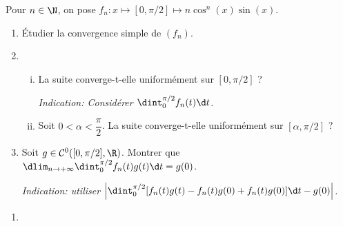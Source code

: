 \begin{enonce}
\begin{exercise}[ID={RMS134 E1489},subtitle={CCINP MP 2023},difficulty={},tags={analyse, ccinp, 2023}]
  Pour $n\in\N$, on pose $f_n:x\mapsto[0,\pi/2]\mapsto n\cos^n(x)\sin(x)$.
 \begin{enumerate}[\bfseries a)]
  \item Étudier la convergence simple de $(f_n)$.
  \item
    \begin{enumerate}[i)]
    \item La suite converge-t-elle uniformément sur $[0,\pi/2]$ ?
      
      {\itshape Indication: Considérer $\dint_0^{\pi/2}f_n(t)\d t$.}
    \item Soit $0<\alpha<\dfrac{\pi}2$. La suite converge-t-elle
      uniformément sur $[\alpha,\pi/2]$ ?
    \end{enumerate}
  \item Soit $g\in\mathcal{C}^0([0,\pi/2],\R)$. Montrer que
    $\dlim_{n\to +\infty}\dint_0^{\pi/2} f_n(t)g(t)\d t=g(0)$.

    {\itshape Indication: utiliser
      $\left|\dint_0^{\pi/2}[f_n(t)g(t)-f_n(t)g(0)+f_n(t)g(0)]
        \d t-g(0)\right|$.}
  \end{enumerate}
\end{exercise}
\begin{solution}
  \begin{enumerate}[\bfseries a)]
  \item 
  \end{enumerate}
\end{solution}
\end{enonce}